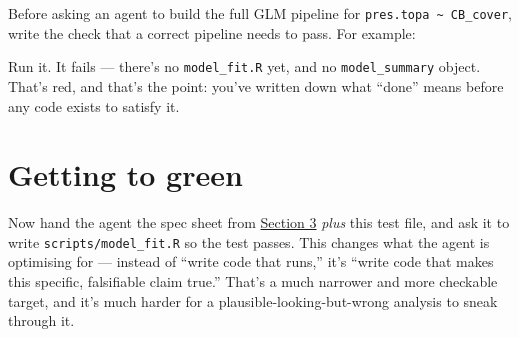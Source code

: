 \documentclass[
  letterpaper,
  DIV=11,
  numbers=noendperiod]{scrreprt}
\newenvironment{Shaded}{\begin{snugshade}}{\end{snugshade}}
\newcommand{\CommentTok}[1]{\textcolor[rgb]{0.37,0.37,0.37}{#1}}
\newcommand{\DecValTok}[1]{\textcolor[rgb]{0.68,0.00,0.00}{#1}}
\newcommand{\FunctionTok}[1]{\textcolor[rgb]{0.28,0.35,0.67}{#1}}
\newcommand{\NormalTok}[1]{\textcolor[rgb]{0.00,0.23,0.31}{#1}}
\newcommand{\SpecialCharTok}[1]{\textcolor[rgb]{0.37,0.37,0.37}{#1}}
\newcommand{\StringTok}[1]{\textcolor[rgb]{0.13,0.47,0.30}{#1}}
\begin{document}
Before asking an agent to build the full GLM pipeline for
\texttt{pres.topa\ \textasciitilde{}\ CB\_cover}, write the check that a
correct pipeline needs to pass. For example:

\begin{Shaded}
\end{Shaded}

Run it. It fails --- there's no \texttt{model\_fit.R} yet, and no
\texttt{model\_summary} object. That's red, and that's the point: you've
written down what ``done'' means before any code exists to satisfy it.

\section{Getting to green}\label{getting-to-green}

Now hand the agent the spec sheet from
\hyperref[specification-sheets]{Section 3} \emph{plus} this test file,
and ask it to write \texttt{scripts/model\_fit.R} so the test passes.
This changes what the agent is optimising for --- instead of ``write
code that runs,'' it's ``write code that makes this specific,
falsifiable claim true.'' That's a much narrower and more checkable
target, and it's much harder for a plausible-looking-but-wrong analysis
to sneak through it.
\end{document}
